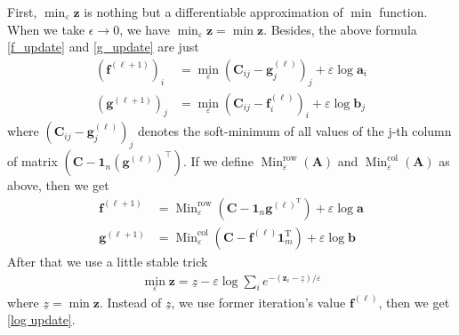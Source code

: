 \documentclass{article}
\begin{document}
\begin{large}
First, $\min _ { \varepsilon } \mathbf { z } $ is nothing but a differentiable approximation of $\min$ function. When we take $\epsilon \to 0$, we have $ \min _ { \varepsilon } \mathbf { z } = \min \mathbf{z}$. Besides, the above formula \ref{f_update} and \ref{g_update} are just
\begin{align}
\left( \mathbf { f } ^ { ( \ell + 1 ) } \right) _ { i } &= \min _ { \varepsilon } \left( \mathbf { C } _ { i j } - \mathbf { g } _ { j } ^ { ( \ell ) } \right) _ { j } + \varepsilon \log \mathbf { a } _ { i }\\
\left( \mathbf { g } ^ { ( \ell + 1 ) } \right) _ { j } &= \min _ { \varepsilon } \left( \mathbf { C } _ { i j } - \mathbf { f } _ { i } ^ { ( \ell ) } \right) _ { i } + \varepsilon \log \mathbf { b } _ { j }
\end{align}
where $\left( \mathbf { C } _ { i j } - \mathbf { g } _ { j } ^ { ( \ell ) } \right) _ { j }$ denotes the soft-minimum of all values of the j-th column of matrix $\left( \mathbf { C } - \mathbf { 1 } _ { n } \left( \mathbf { g } ^ { ( \ell ) } \right) ^ { \top } \right)$. If we define $ \operatorname { Min } _ { \varepsilon } ^ { \mathrm { row } } ( \mathbf { A } ) $ and $ \operatorname { Min } _ { \varepsilon } ^ { \mathrm { col } } ( \mathbf { A } ) $ as above, then we get
\begin{align}
\mathbf { f } ^ { ( \ell + 1 ) } &= \operatorname { Min } _ { \varepsilon } ^ { \mathrm { row } } \left( \mathbf { C } - \mathbf { 1 } _ { n } \mathbf { g } ^ { ( \ell ) ^ { \mathrm { T } } } \right) + \varepsilon \log \mathbf { a }\\
\mathbf { g } ^ { ( \ell + 1 ) } &= \operatorname { Min } _ { \varepsilon } ^ { \mathrm { col } } \left( \mathbf { C } - \mathbf { f } ^ { ( \ell ) } \mathbf { 1 } _ { m } ^ { \mathrm { T } } \right) + \varepsilon \log \mathbf { b }
\end{align}
After that we use a little stable trick
\begin{align}
\min _ { \varepsilon } \mathbf { z } = \underline { z } - \varepsilon \log \sum _ { i } e ^ { - \left( \mathbf { z } _ { i } - \underline { z } \right) / \varepsilon }
\end{align}
where $\underline{z} = \min \mathbf{z}$. Instead of $\underline{z}$, we use former iteration's value $\mathbf { f } ^ { ( \ell ) }$, then we get \ref{log update}.


\end{large}
\end{document}
